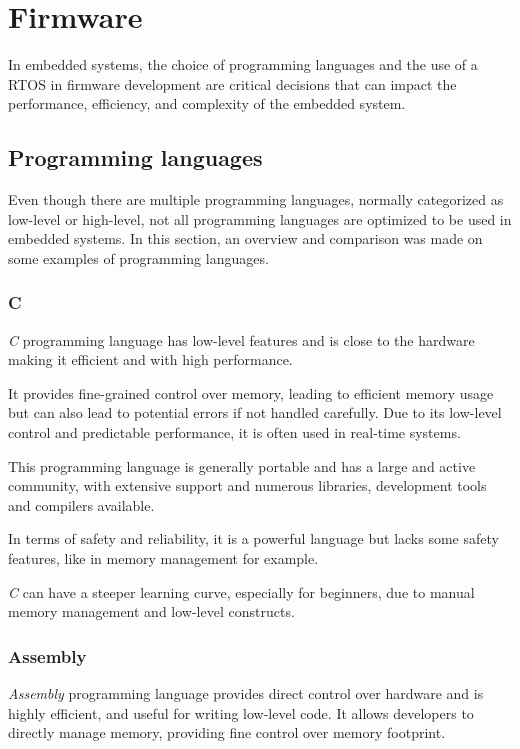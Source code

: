 \section{Firmware}
In embedded systems, the choice of programming languages and the use of a \gls{RTOS} in firmware development are critical decisions that can impact the performance, efficiency, and complexity of the embedded system.\\

\subsection{Programming languages}
Even though there are multiple programming languages, normally categorized as low-level or high-level, not all programming languages are optimized to be used in embedded systems.
In this section, an overview and comparison was made on some examples of programming languages.
\subsubsection{C}
\textit{C} programming language has low-level features and is close to the hardware making it efficient and with high performance.

It provides fine-grained control over memory, leading to efficient memory usage but can also lead to potential errors if not handled carefully.
Due to its low-level control and predictable performance, it is often used in real-time systems.

This programming language is generally portable and has a large and active community, with extensive support and numerous libraries, development tools and compilers available.

In terms of safety and reliability, it is a powerful language but lacks some safety features, like in memory management for example.

\textit{C} can have a steeper learning curve, especially for beginners, due to manual memory management and low-level constructs.

\subsubsection{Assembly}
\textit{Assembly} programming language provides direct control over hardware and is highly efficient, and useful for writing low-level code.
It allows developers to directly manage memory, providing fine control over memory footprint.

